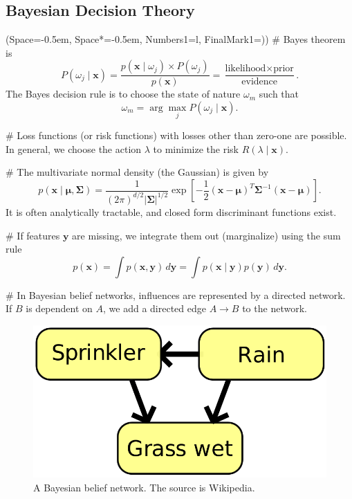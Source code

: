 \documentclass[12pt, a4paper]{article}
\newcommand{\listSpace}{-0.5em}%
\newcommand{\vect}[1]{\bm{#1}}
\newcommand{\abs}[1]{\left\lvert#1\right\rvert}
\begin{document}
\subsection{Bayesian Decision Theory}
\begin{easylist}[itemize]
\ListProperties(Space=\listSpace, Space*=\listSpace, Numbers1=l, FinalMark1={)})
# Bayes theorem is
\begin{equation*}
	P(\omega_j \mid \vect{x}) = \frac{p(\vect{x} \mid \omega_j) \times P(\omega_j)}{p(\vect{x})}
	= \frac{\text{likelihood} \times \text{prior}}{\text{evidence}}.
\end{equation*}
The Bayes decision rule is to choose the state of nature $\omega_m$ such that
\begin{equation*}
	\omega_m = \arg \max_j P(\omega_j \mid \vect{x}).
\end{equation*}

# Loss functions (or risk functions) with losses other than zero-one are possible.
 In general, we choose the action $\lambda$ to minimize the risk $R(\lambda \mid \vect{x})$.
 
# The multivariate normal density (the Gaussian) is given by
\begin{equation*}
	p(\vect{x} \mid \vect{\mu}, \vect{\Sigma}) = \frac{1}{(2 \pi)^{d/2} \abs{\vect{\Sigma}}^{1/2}} 
	\exp \left[ - \frac{1}{2} 
	\left( \vect{x} - \vect{\mu} \right)^T \vect{\Sigma}^{-1} 
	\left( \vect{x} - \vect{\mu} \right) \right].
\end{equation*}
It is often analytically tractable, and closed form discriminant functions exist.

# If features $\vect{y}$ are missing, we integrate them out (marginalize) using the sum rule
\begin{equation*}
	p(\vect{x}) = \int p(\vect{x}, \vect{y}) \, d\vect{y} = \int p(\vect{x} \mid \vect{y}) p(\vect{y}) \, d\vect{y}.
\end{equation*}

# In Bayesian belief networks, influences are represented by a directed network.
If $B$ is dependent on $A$, we add a directed edge $A \to B$ to the network.
\end{easylist}
\begin{figure}[ht!]
\centering
\includegraphics[width=0.3\linewidth]{figs/bayesian_belief_network}
\caption{A Bayesian belief network. The source is Wikipedia.}
\label{fig:bayesian_belief_network}
\end{figure}
\end{document}
